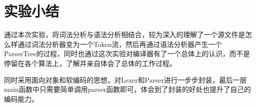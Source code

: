 \section{实验小结}
通过本次实验，将词法分析与语法分析相结合，较为深入的理解了一个源文件是怎么样通过词法分析器变为一个Token流，然后再通过语法分析器产生一个ParserTree的过程，同时也通过这次实验对编译器有了一个总体上的认识，而不是停留在各个算法上，了解并亲自体会了总体的工作过程。


同时采用面向对象和软编码的思想，对Lexer和Parser进行一步步封装，最后一层main函数中只需要简单调用parser函数即可，体会到了封装的好处也提升了自己的编码能力。